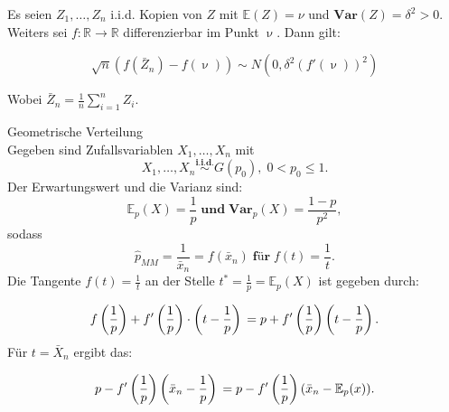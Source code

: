 \documentclass[10pt]{article}
\newcommand{\FZV}{X_1, \ldots, X_n} %
\newcommand{\IR}{\mathbb{R}} %
\newcommand{\EW}{\mathbb{E}} %
\newenvironment{BSP}[1][]
{\begin{Beispiel}[frametitle=#1]}{\end{Beispiel}}
\begin{document}
	\noindent Es seien $Z_1, \ldots, Z_n$ i.i.d. Kopien von $Z$ mit $\EW(Z)=\nu$ und $\textbf{Var}(Z)=\delta^2 > 0$. Weiters sei $f: \IR \rightarrow \IR$ differenzierbar im Punkt $\upnu$. Dann gilt:
	
	\begin{equation*}
		\sqrt{n} (f(\bar{Z}_n)-f(\upnu)) \sim N(0, \delta^2 (f'(\upnu))^2)
	\end{equation*}
	
	\noindent Wobei $\bar{Z}_n =  \frac{1}{n}\sum_{i=1}^{n} Z_i$.
	
	\pagebreak
	\begin{BSP}[Beispiel 1..... (Delta-Methode)]
		
		Geometrische Verteilung \\
		Gegeben sind Zufallsvariablen $\FZV$ mit
		\begin{equation*}
			\FZV \overset{\textbf{i.i.d.}}{\sim} G(p_0), \; 0 < p_0 \leq 1.
		\end{equation*} 
		Der Erwartungswert und die Varianz sind:
		\begin{equation*}
			\EW_p(X) = \frac{1}{p} \; \textbf{und} \;  \textbf{Var}_p(X) = \frac{1-p}{p^2},
		\end{equation*}
		sodass
		\begin{equation*}
			\hat{p}_{MM} = \frac{1}{\bar{x}_n} = f(\bar{x}_n) \; \textbf{für} \; f(t)= \frac{1}{t}.
		\end{equation*} 
		Die Tangente $f(t) = \frac{1}{t}$ an der Stelle $t^* = \frac{1}{p} = \EW_p(X)$ ist gegeben durch:
		
		\begin{equation*}
			f\left(\frac{1}{p}\right) + f'\left(\frac{1}{p}\right) \cdot \left(t-\frac{1}{p}\right)\\
			= p + f'\left(\frac{1}{p}\right) \left(t-\frac{1}{p}\right).
		\end{equation*}
		Für $t=\bar{X}_n$ ergibt das:
		
		\begin{equation*}
			p - f'\left(\frac{1}{p}\right) \left(\bar{x}_n - \frac{1}{p}\right) \\
			= p - f'\left(\frac{1}{p}\right) (\bar{x}_n - \EW_p(x)).
		\end{equation*}
		
	\end{BSP}
	
\end{document}
